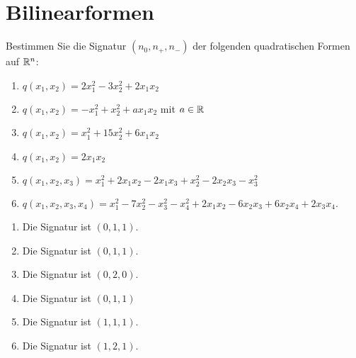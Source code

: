 \section{Bilinearformen}







\begin{question}[subtitle = Berechnung der Signatur quadratischer Formen]{1}
  Bestimmen Sie die Signatur $(n_0, n_+, n_-)$ der folgenden quadratischen Formen auf $\mathbb{R}^n$:
  \begin{enumerate}[leftmargin=*]
    \item
      $
          q(x_1, x_2)
        = 2 x_1^2 - 3 x_2^2 + 2 x_1 x_2
      $
    \item
      $
          q(x_1, x_2)
        = - x_1^2 + x_2^2 + a x_1 x_2
      $
      mit $a \in \mathbb{R}$
    \item
      $
          q(x_1, x_2)
        = x_1^2 + 15 x_2^2 + 6 x_1 x_2
      $
    \item
      $
          q(x_1, x_2)
        = 2 x_1 x_2
      $
    \item
      $
          q(x_1, x_2, x_3)
        = x_1^2 + 2 x_1 x_2 - 2 x_1 x_3 + x_2^2 - 2 x_2 x_3 - x_3^2
      $
    \item
      $
          q(x_1, x_2, x_3, x_4)
        = x_1^2 - 7 x_2^2 - x_3^2 - x_4^2 + 2 x_1 x_2 - 6 x_2 x_3 + 6 x_2 x_4 + 2 x_3 x_4.
      $
  \end{enumerate}
\end{question}
\begin{solution}
  \begin{enumerate}[leftmargin=*]
    \item
      Die Signatur ist $(0,1,1)$.
    \item
      Die Signatur ist $(0,1,1)$.
    \item
      Die Signatur ist $(0,2,0)$.
    \item
      Die Signatur ist $(0,1,1)$
    \item
      Die Signatur ist $(1,1,1)$.
    \item
      Die Signatur ist $(1,2,1)$.
  \end{enumerate}
\end{solution}


